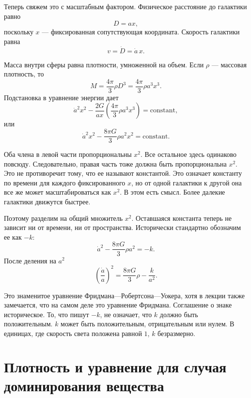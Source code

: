 Теперь свяжем это с масштабным фактором. Физическое расстояние до галактики равно
\begin{equation}
D=ax,
\end{equation}
поскольку \(x\) — фиксированная сопутствующая координата. Скорость галактики равна
\begin{equation}
v=\dot D=\dot a\,x.
\end{equation}

Масса внутри сферы равна плотности, умноженной на объем. Если \(\rho\) — массовая плотность, то
\begin{equation}
M=\frac{4\pi}{3}\rho D^3=\frac{4\pi}{3}\rho a^3x^3.
\end{equation}
Подстановка в уравнение энергии дает
\begin{equation}
\dot a^2x^2-\frac{2G}{ax}\left(\frac{4\pi}{3}\rho a^3x^3\right)=\text{constant},
\end{equation}
или
\begin{equation}
\dot a^2x^2-\frac{8\pi G}{3}\rho a^2x^2=\text{constant}.
\end{equation}

Оба члена в левой части пропорциональны \(x^2\). Все остальное здесь одинаково повсюду. Следовательно, правая часть тоже должна быть пропорциональна \(x^2\). Это не противоречит тому, что ее называют константой. Это означает константу по времени для каждого фиксированного \(x\), но от одной галактики к другой она все же может масштабироваться как \(x^2\). В этом есть смысл. Более далекие галактики движутся быстрее.

Поэтому разделим на общий множитель \(x^2\). Оставшаяся константа теперь не зависит ни от времени, ни от пространства. Исторически стандартно обозначим ее как \(-k\):
\begin{equation}
\dot a^2-\frac{8\pi G}{3}\rho a^2=-k.
\end{equation}
После деления на \(a^2\)
\begin{equation}
\left(\frac{\dot a}{a}\right)^2=\frac{8\pi G}{3}\rho-\frac{k}{a^2}.
\end{equation}

Это знаменитое уравнение Фридмана—Робертсона—Уокера, хотя в лекции также замечается, что на самом деле это уравнение Фридмана. Соглашение о знаке историческое. То, что пишут \(-k\), не означает, что \(k\) должно быть положительным. \(k\) может быть положительным, отрицательным или нулем. В единицах, где скорость света положена равной \(1\), \(k\) безразмерно.

\section{Плотность и уравнение для случая доминирования вещества}

